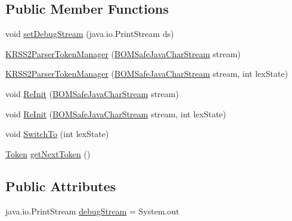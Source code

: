 \subsection*{Public Member Functions}
\begin{DoxyCompactItemize}
\item 
void \hyperlink{classde_1_1uulm_1_1ecs_1_1ai_1_1owlapi_1_1krssparser_1_1_k_r_s_s2_parser_token_manager_a4fcca313b0f680033c451457f2d3117a}{set\-Debug\-Stream} (java.\-io.\-Print\-Stream ds)
\item 
\hyperlink{classde_1_1uulm_1_1ecs_1_1ai_1_1owlapi_1_1krssparser_1_1_k_r_s_s2_parser_token_manager_a5a5df4c5b27808830581c2b77956e70e}{K\-R\-S\-S2\-Parser\-Token\-Manager} (\hyperlink{classuk_1_1ac_1_1manchester_1_1cs_1_1_b_o_m_safe_java_char_stream}{B\-O\-M\-Safe\-Java\-Char\-Stream} stream)
\item 
\hyperlink{classde_1_1uulm_1_1ecs_1_1ai_1_1owlapi_1_1krssparser_1_1_k_r_s_s2_parser_token_manager_a74bc3a608509e4bbc0163deda0fb22dc}{K\-R\-S\-S2\-Parser\-Token\-Manager} (\hyperlink{classuk_1_1ac_1_1manchester_1_1cs_1_1_b_o_m_safe_java_char_stream}{B\-O\-M\-Safe\-Java\-Char\-Stream} stream, int lex\-State)
\item 
void \hyperlink{classde_1_1uulm_1_1ecs_1_1ai_1_1owlapi_1_1krssparser_1_1_k_r_s_s2_parser_token_manager_af3fe66bc0c7852c62bacd0ec2767a732}{Re\-Init} (\hyperlink{classuk_1_1ac_1_1manchester_1_1cs_1_1_b_o_m_safe_java_char_stream}{B\-O\-M\-Safe\-Java\-Char\-Stream} stream)
\item 
void \hyperlink{classde_1_1uulm_1_1ecs_1_1ai_1_1owlapi_1_1krssparser_1_1_k_r_s_s2_parser_token_manager_a831636b26e0cfc822352541de252a1e5}{Re\-Init} (\hyperlink{classuk_1_1ac_1_1manchester_1_1cs_1_1_b_o_m_safe_java_char_stream}{B\-O\-M\-Safe\-Java\-Char\-Stream} stream, int lex\-State)
\item 
void \hyperlink{classde_1_1uulm_1_1ecs_1_1ai_1_1owlapi_1_1krssparser_1_1_k_r_s_s2_parser_token_manager_a36ecd4229ca9d235ce3663bcc995ec95}{Switch\-To} (int lex\-State)
\item 
\hyperlink{classde_1_1uulm_1_1ecs_1_1ai_1_1owlapi_1_1krssparser_1_1_token}{Token} \hyperlink{classde_1_1uulm_1_1ecs_1_1ai_1_1owlapi_1_1krssparser_1_1_k_r_s_s2_parser_token_manager_a923c0a9250b4a576416d18d638203e84}{get\-Next\-Token} ()
\end{DoxyCompactItemize}
\subsection*{Public Attributes}
\begin{DoxyCompactItemize}
\item 
java.\-io.\-Print\-Stream \hyperlink{classde_1_1uulm_1_1ecs_1_1ai_1_1owlapi_1_1krssparser_1_1_k_r_s_s2_parser_token_manager_aade99d6e1d34ac266d200f832a796a3b}{debug\-Stream} = System.\-out
\end{DoxyCompactItemize}
